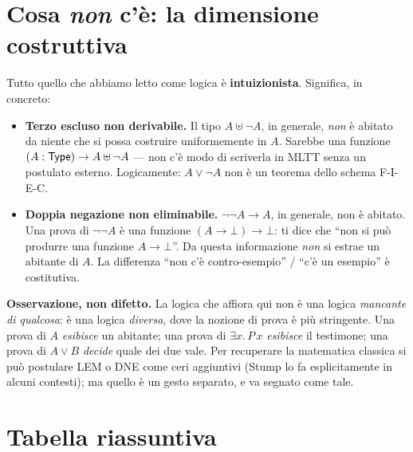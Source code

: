 \section*{Cosa \emph{non} c'\`e: la dimensione costruttiva}

Tutto quello che abbiamo letto come logica \`e \textbf{intuizionista}. Significa, in concreto:

\begin{itemize}
\item \textbf{Terzo escluso non derivabile.} Il tipo $A \uplus \neg A$, in generale, \emph{non} \`e abitato da niente che si possa costruire uniformemente in $A$. Sarebbe una funzione $(A : \mathsf{Type}) \to A \uplus \neg A$ --- non c'\`e modo di scriverla in MLTT senza un postulato esterno. Logicamente: $A \vee \neg A$ non \`e un teorema dello schema F-I-E-C.
\item \textbf{Doppia negazione non eliminabile.} $\neg\neg A \to A$, in generale, non \`e abitato. Una prova di $\neg\neg A$ \`e una funzione $(A \to \bot) \to \bot$: ti dice che ``non si pu\`o produrre una funzione $A \to \bot$''. Da questa informazione \emph{non} si estrae un abitante di $A$. La differenza ``non c'\`e contro-esempio'' / ``c'\`e un esempio'' \`e costitutiva.
\end{itemize}

\noindent\textbf{Osservazione, non difetto.} La logica che affiora qui non \`e una logica \emph{mancante di qualcosa}: \`e una logica \emph{diversa}, dove la nozione di prova \`e pi\`u stringente. Una prova di $A$ \emph{esibisce} un abitante; una prova di $\exists x.\,P\,x$ \emph{esibisce} il testimone; una prova di $A \vee B$ \emph{decide} quale dei due vale. Per recuperare la matematica classica si pu\`o postulare LEM o DNE come ceri aggiuntivi (Stump lo fa esplicitamente in alcuni contesti); ma quello \`e un gesto separato, e va segnato come tale.

\section*{Tabella riassuntiva}

